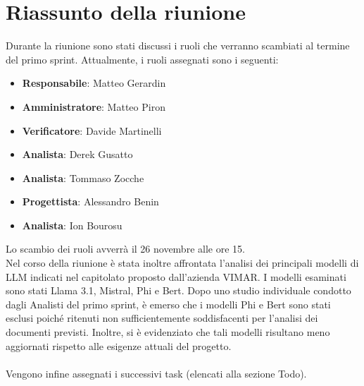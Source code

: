 \section{Riassunto della riunione}
Durante la riunione sono stati discussi i ruoli che verranno scambiati al termine del primo sprint. Attualmente, i ruoli assegnati sono i seguenti:
\begin{itemize}
    \item \textbf{Responsabile}: Matteo Gerardin 
    \item \textbf{Amministratore}: Matteo Piron 
    \item \textbf{Verificatore}: Davide Martinelli
    \item \textbf{Analista}: Derek Gusatto
    \item \textbf{Analista}: Tommaso Zocche
    \item \textbf{Progettista}: Alessandro Benin
    \item \textbf{Analista}: Ion Bourosu
\end{itemize}
Lo scambio dei ruoli avverrà il 26 novembre alle ore 15.
\\
Nel corso della riunione è stata inoltre affrontata l’analisi dei principali modelli di LLM indicati nel capitolato proposto dall’azienda VIMAR. I modelli esaminati sono stati Llama 3.1, Mistral, Phi e Bert. Dopo uno studio individuale condotto dagli Analisti del primo sprint, è emerso che i modelli Phi e Bert sono stati esclusi poiché ritenuti non sufficientemente soddisfacenti per l’analisi dei documenti previsti. Inoltre, si è evidenziato che tali modelli risultano meno aggiornati rispetto alle esigenze attuali del progetto.
\\
\\
Vengono infine assegnati i successivi task (elencati alla sezione Todo).


